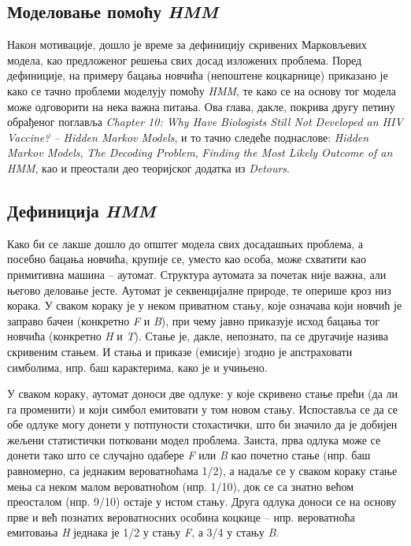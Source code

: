 \documentclass[12pt,oneside]{memoir}
\begin{document}
\begin{CJK}{UTF8}{ipxm}
\chapter{Моделовање помоћу \textit{HMM}}
Након мотивације, дошло је време за дефиницију скривених Марковљевих модела, као предложеног решења свих досад изложених проблема. Поред дефиниције, на примеру бацања новчића (непоштене коцкарнице) приказано је како се тачно проблеми моделују помоћу \textit{HMM}, те како се на основу тог модела може одговорити на нека важна питања. Ова глава, дакле, покрива другу петину обрађеног поглавља \textit{Chapter 10: Why Have Biologists Still Not Developed an HIV Vaccine? -- Hidden Markov Models}, и то тачно следеће поднаслове: \textit{Hidden Markov Models}, \textit{The Decoding Problem}, \textit{Finding the Most Likely Outcome of an HMM}, као и преостали део теоријског додатка из \textit{Detours}.

\section{Дефиниција \textit{HMM}}
Како би се лакше дошло до општег модела свих досадашњих проблема, а посебно бацања новчића, крупије се, уместо као особа, може схватити као примитивна машина -- аутомат. Структура аутомата за почетак није важна, али његово деловање јесте. Аутомат је секвенцијалне природе, те оперише кроз низ корака. У сваком кораку је у неком приватном стању, које означава који новчић је заправо бачен (конкретно \textit{F} и \textit{B}), при чему јавно приказује исход бацања тог новчића (конкретно \textit{H} и \textit{T}). Стање је, дакле, непознато, па се другачије назива скривеним стањем. И стања и приказе (емисије) згодно је апстраховати симболима, нпр. баш карактерима, како је и учињено.

У сваком кораку, аутомат доноси две одлуке: у које скривено стање прећи (да ли га променити) и који симбол емитовати у том новом стању. Испоставља се да се обе одлуке могу донети у потпуности стохастички, што би значило да је добијен жељени статистички потковани модел проблема. Заиста, прва одлука може се донети тако што се случајно одабере \textit{F} или \textit{B} као почетно стање (нпр. баш равномерно, са једнаким вероватноћама 1/2), а надаље се у сваком кораку стање мења са неком малом вероватноћом (нпр. 1/10), док се са знатно већом преосталом (нпр. 9/10) остаје у истом стању. Друга одлука доноси се на основу прве и већ познатих вероватносних особина коцкице -- нпр. вероватноћа емитовања \textit{H} једнака је 1/2 у стању \textit{F}, а 3/4 у стању \textit{B}.


\end{CJK}
\end{document}
